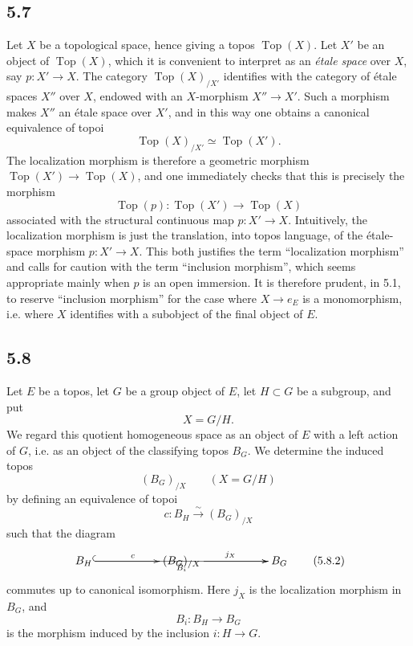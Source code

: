 \documentclass[11pt]{article}
\newcommand{\Top}{\operatorname{Top}}
\begin{document}
\subsection*{5.7}
Let \(X\) be a topological space, hence giving a topos \(\Top(X)\). Let \(X'\) be an object of \(\Top(X)\), which it is convenient to interpret as an \emph{\'etale space} over \(X\), say \(p:X'\to X\). The category \(\Top(X)_{/X'}\) identifies with the category of \'etale spaces \(X''\) over \(X\), endowed with an \(X\)-morphism \(X''\to X'\). Such a morphism makes \(X''\) an \'etale space over \(X'\), and in this way one obtains a canonical equivalence of topoi
\[
\Top(X)_{/X'}\simeq \Top(X').
\]
The localization morphism is therefore a geometric morphism \(\Top(X')\to\Top(X)\), and one immediately checks that this is precisely the morphism
\[
\Top(p):\Top(X')\longrightarrow\Top(X)
\]
associated with the structural continuous map \(p:X'\to X\). Intuitively, the localization morphism is just the translation, into topos language, of the \'etale-space morphism \(p:X'\to X\). This both justifies the term ``localization morphism'' and calls for caution with the term ``inclusion morphism'', which seems appropriate mainly when \(p\) is an open immersion. It is therefore prudent, in 5.1, to reserve ``inclusion morphism'' for the case where \(X\to e_E\) is a monomorphism, i.e. where \(X\) identifies with a subobject of the final object of \(E\).

\subsection*{5.8}
Let \(E\) be a topos, let \(G\) be a group object of \(E\), let \(H\subset G\) be a subgroup, and put
\[
X=G/H.
\]
We regard this quotient homogeneous space as an object of \(E\) with a left action of \(G\), i.e. as an object of the classifying topos \(B_G\). We determine the induced topos
\[
(B_G)_{/X}\qquad (X=G/H)
\]
by defining an equivalence of topoi
\begin{equation*}
c:B_H\xrightarrow{\sim}(B_G)_{/X}\tag{5.8.1}
\end{equation*}
such that the diagram
\[
\xymatrix@C=2cm{B_H\ar[r]^c\ar@{^{(}->}[rr]_{B_i} & (B_G)_{/X}\ar[r]^{j_X} & B_G}
\tag{5.8.2}
\]
commutes up to canonical isomorphism. Here \(j_X\) is the localization morphism in \(B_G\), and
\[
B_i:B_H\longrightarrow B_G
\]
is the morphism induced by the inclusion \(i:H\to G\).
\end{document}
